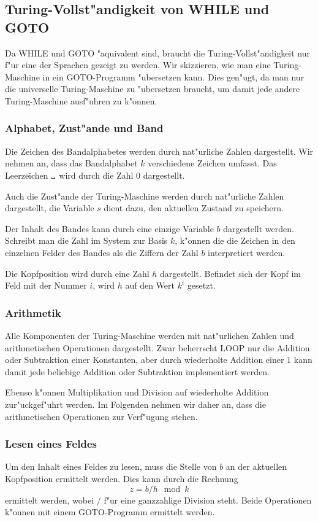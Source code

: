 \subsection{Turing-Vollst"andigkeit von WHILE und GOTO}
Da WHILE und GOTO "aquivalent sind, braucht die Turing-Vollst"andigkeit
nur f"ur eine der Sprachen gezeigt zu werden.
Wir skizzieren, wie man eine Turing-Maschine in ein GOTO-Programm
"ubersetzen kann. Dies gen"ugt, da man nur die universelle
Turing-Maschine zu "ubersetzen braucht, um damit jede andere
Turing-Maschine ausf"uhren zu k"onnen.

\subsubsection{Alphabet, Zust"ande und Band}
Die Zeichen des Bandalphabetes werden durch nat"urliche Zahlen
dargestellt.  Wir nehmen an, dass das Bandalphabet $k$ verschiedene Zeichen
umfasst. Das Leerzeichen $\text{\textvisiblespace}$ wird durch die Zahl $0$
dargestellt.

Auch die Zust"ande der Turing-Maschine werden durch nat"urliche Zahlen
dargestellt,
die Variable $s$ dient dazu, den aktuellen Zustand zu
speichern.

Der Inhalt des Bandes kann durch eine einzige Variable $b$ dargestellt
werden. Schreibt man die Zahl im System zur Basis $k$, k"onnen die
die Zeichen in den einzelnen Felder des Bandes als die Ziffern
der Zahl $b$ interpretiert werden.

Die Kopfposition wird durch eine Zahl $h$ dargestellt. Befindet sich
der Kopf im Feld mit der Nummer $i$, wird $h$ auf den Wert $k^i$
gesetzt.

\subsubsection{Arithmetik}
Alle Komponenten der Turing-Maschine werden mit nat"urlichen Zahlen
und arithmetischen Operationen dargestellt.
Zwar beherrscht LOOP nur die Addition oder Subtraktion einer Konstanten,
aber durch wiederholte Addition einer $1$ kann damit jede beliebige
Addition oder Subtraktion implementiert werden.

Ebenso k"onnen Multiplikation und Division auf wiederholte Addition
zur"uckgef"uhrt werden.
Im Folgenden nehmen wir daher an, dass die arithmetischen Operationen
zur Verf"ugung stehen.

\subsubsection{Lesen eines Feldes}
Um den Inhalt eines Feldes zu lesen, muss die Stelle von $b$ an der
aktuellen Kopfposition ermittelt werden.
Dies kann durch die Rechnung
\begin{equation}
z=b / h \mod k
\label{getchar}
\end{equation}
ermittelt werden, wobei $/$ f"ur eine ganzzahlige Division steht.
Beide Operationen k"onnen mit einem GOTO-Programm ermittelt werden.

